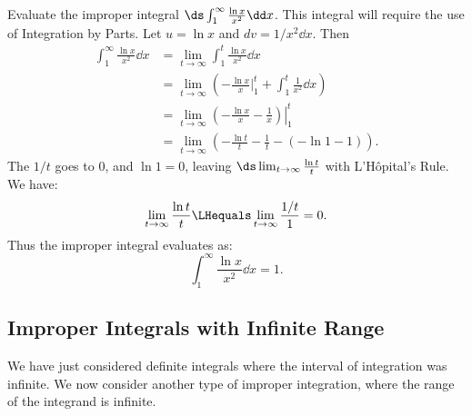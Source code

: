 \begin{example}\label{ex_impint2}
Evaluate the improper integral $\ds \int_1^\infty \frac{\ln x}{x^2}\dd x$.
\solution
This integral will require the use of Integration by Parts. Let $u = \ln x$ and $dv = 1/x^2\dd x$. Then
%
%
\begin{align*}
	\int_1^\infty\frac{\ln x}{x^2}\dd x
	&= \lim_{t\to\infty}\int_1^t\frac{\ln x}{x^2}\dd x \\
	&=  \lim_{t\to\infty}\left(-\frac{\ln x}{x}\Big|_1^t +\int_1^t \frac{1}{x^2}\dd x \right)\\
	&=  \lim_{t\to\infty} \left.\left(-\frac{\ln x}{x} -\frac1x\right)\right|_1^t\\
	&=	\lim_{t\to\infty} \left(-\frac{\ln t}{t}-\frac1t - \left(-\ln 1-1\right)\right).
\end{align*}
The $1/t$ goes to 0, and $\ln 1=0$, leaving
$\ds \lim_{t\to\infty} \frac{\ln t}{t}$ with L'Hôpital's Rule. We have:
\[\lim_{t\to\infty}\frac{\ln t}t \LHequals \lim_{t\to\infty} \frac{1/t}{1} = 0.\]
Thus the improper integral evaluates as:
\[\int_1^\infty\frac{\ln x}{x^2}\dd x = 1.\]
\end{example}

\subsection{Improper Integrals with Infinite Range}

We have just considered definite integrals where the interval of integration was infinite. We now consider another type of improper integration, where the range of the integrand is infinite.

